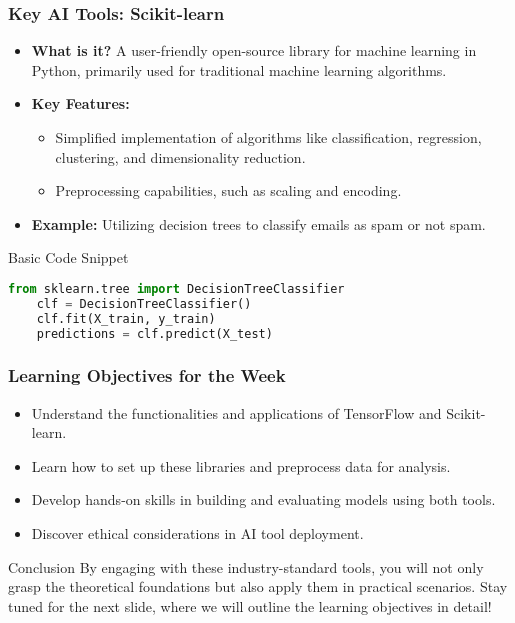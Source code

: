 \documentclass[aspectratio=169]{beamer}
\begin{document}
\begin{frame}[fragile]
    \frametitle{Key AI Tools: Scikit-learn}
    \begin{itemize}
        \item \textbf{What is it?} A user-friendly open-source library for machine learning in Python, primarily used for traditional machine learning algorithms.
        \item \textbf{Key Features:}
        \begin{itemize}
            \item Simplified implementation of algorithms like classification, regression, clustering, and dimensionality reduction.
            \item Preprocessing capabilities, such as scaling and encoding.
        \end{itemize}
        \item \textbf{Example:} Utilizing decision trees to classify emails as spam or not spam.
    \end{itemize}
    \begin{block}{Basic Code Snippet}
    \begin{lstlisting}[language=Python]
    from sklearn.tree import DecisionTreeClassifier
    clf = DecisionTreeClassifier()
    clf.fit(X_train, y_train)
    predictions = clf.predict(X_test)
    \end{lstlisting}
    \end{block}
\end{frame}

\begin{frame}
    \frametitle{Learning Objectives for the Week}
    \begin{itemize}
        \item Understand the functionalities and applications of TensorFlow and Scikit-learn.
        \item Learn how to set up these libraries and preprocess data for analysis.
        \item Develop hands-on skills in building and evaluating models using both tools.
        \item Discover ethical considerations in AI tool deployment.
    \end{itemize}
    \begin{block}{Conclusion}
        By engaging with these industry-standard tools, you will not only grasp the theoretical foundations but also apply them in practical scenarios. 
        Stay tuned for the next slide, where we will outline the learning objectives in detail!
    \end{block}
\end{frame}
\end{document}
